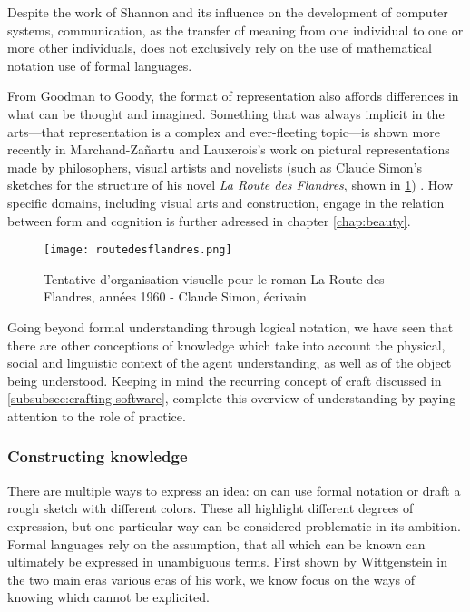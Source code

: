 Despite the work of Shannon \citep{shannon_mathematical_2001} and its influence on the development of computer systems, communication, as the transfer of meaning from one individual to one or more other individuals, does not exclusively rely on the use of mathematical notation use of formal languages.

From Goodman to Goody, the format of representation also affords differences in what can be thought and imagined. Something that was always implicit in the arts—that representation is a complex and ever-fleeting topic—is shown more recently in Marchand-Zañartu and Lauxerois's work on pictural representations made by philosophers, visual artists and novelists (such as Claude Simon's sketches for the structure of his novel \emph{La Route des Flandres}, shown in \ref{graphic:routedesflandres}) \citep{marchand-zanartu_32_2022}. How specific domains, including  visual arts and construction, engage in the relation between form and cognition is further adressed in chapter \ref{chap:beauty}.

\begin{figure}
    \texttt{[image: routedesflandres.png]}
    \caption{Tentative d'organisation visuelle pour le roman La Route des Flandres, années 1960 - Claude Simon, écrivain}
    \label{graphic:routedesflandres}
\end{figure}

Going beyond formal understanding through logical notation, we have seen that there are other conceptions of knowledge which take into account the physical, social and linguistic context of the agent understanding, as well as of the object being understood. Keeping in mind the recurring concept of craft discussed in \ref{subsubsec:crafting-software}, complete this overview of understanding by paying attention to the role of practice.

\subsubsection{Constructing knowledge}
\label{subsubsec:constructing-knowledge}

There are multiple ways to express an idea: on can use formal notation or draft a rough sketch with different colors. These all highlight different degrees of expression, but one particular way can be considered problematic in its ambition. Formal languages rely on the assumption, that all which can be known can ultimately be expressed in unambiguous terms. First shown by Wittgenstein in the two main eras various eras of his work, we know focus on the ways of knowing which cannot be explicited.

